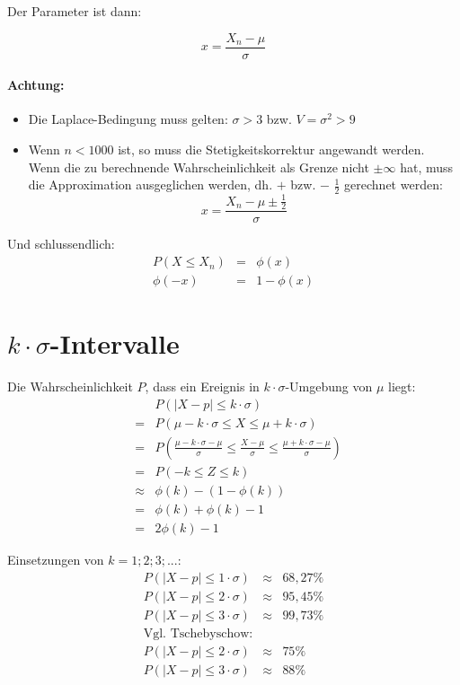 \documentclass[12pt,a4paper,twocolumn]{article}
\begin{document}
Der Parameter ist dann:

$$
x = \frac{X_n - \mu}{\sigma}
$$

\paragraph{Achtung:}
 \begin{itemize}
   \item Die Laplace-Bedingung muss gelten: $\sigma>3$ bzw. $V=\sigma^2>9$\\
   \item Wenn $n<1000$ ist, so muss die Stetigkeitskorrektur angewandt werden. Wenn die zu berechnende Wahrscheinlichkeit als Grenze nicht $\pm \infty$ hat, muss die Approximation ausgeglichen werden, dh. $+$ bzw. $-$ $\frac{1}{2}$ gerechnet werden: $$x = \frac{X_n - \mu \pm \frac{1}{2}}{\sigma}$$
 \end{itemize}


Und schlussendlich:
\begin{eqnarray}
P(X \le X_n) &=& \phi(x) \\
\phi(-x) &=& 1 - \phi(x)
\end{eqnarray}

\section{$k\cdot\sigma$-Intervalle}
Die Wahrscheinlichkeit $P$, dass ein Ereignis in $k \cdot \sigma$-Umgebung von $\mu$ liegt:\\

\begin{eqnarray}
& &P(|X-p|\le k\cdot\sigma)\\
 &=& P(\mu-k\cdot\sigma\le X \le \mu + k\cdot\sigma)\\
&=& P\left(\frac{\mu-k\cdot\sigma - \mu}{\sigma}\le \frac{X - \mu}{\sigma}\le \frac{\mu + k\cdot\sigma - \mu}{\sigma}\right) \nonumber \\
&=& P(-k \le Z \le k)\\
&\approx& \phi(k) - (1 - \phi(k))\\
&=& \phi(k) + \phi(k) - 1\\
&=& 2\phi(k)- 1
\end{eqnarray}

Einsetzungen von $ k = {1;2;3; ...}$:
\begin{eqnarray}
P(|X-p|\le 1\cdot\sigma) &\approx& 68,27 \%\\
P(|X-p|\le 2\cdot\sigma) &\approx& 95,45 \%\\
P(|X-p|\le 3\cdot\sigma) &\approx& 99,73 \%\\
\text{Vgl. Tschebyschow:} \nonumber \\
P(|X-p|\le 2\cdot\sigma) &\approx& 75 \%\\
P(|X-p|\le 3\cdot\sigma) &\approx& 88 \%
\end{eqnarray}
\end{document}
